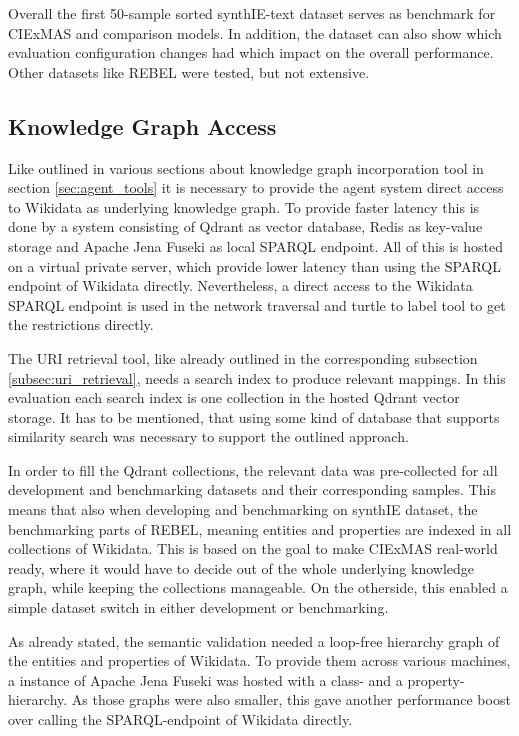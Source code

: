 \documentclass[a4paper,oneside,bibliography=totoc]{scrbook}
\begin{document}
Overall the first 50-sample sorted synthIE-text dataset serves as benchmark for CIExMAS and comparison models. In addition, the dataset can also show which evaluation configuration changes had which impact on the overall performance. Other datasets like REBEL were tested, but not extensive.

\subsection{Knowledge Graph Access}

Like outlined in various sections about knowledge graph incorporation tool in section \ref{sec:agent_tools} it is necessary to provide the agent system direct access to Wikidata as underlying knowledge graph. To provide faster latency this is done by a system consisting of Qdrant as vector database, Redis as key-value storage and Apache Jena Fuseki as local SPARQL endpoint. All of this is hosted on a virtual private server, which provide lower latency than using the SPARQL endpoint of Wikidata directly. Nevertheless, a direct access to the Wikidata SPARQL endpoint is used in the network traversal and turtle to label tool to get the restrictions directly.

The URI retrieval tool, like already outlined in the corresponding subsection \ref{subsec:uri_retrieval}, needs a search index to produce relevant mappings. In this evaluation each search index is one collection in the hosted Qdrant vector storage. It has to be mentioned, that using some kind of database that supports similarity search was necessary to support the outlined approach.

In order to fill the Qdrant collections, the relevant data was pre-collected for all development and benchmarking datasets and their corresponding samples. This means that also when developing and benchmarking on synthIE dataset, the benchmarking parts of REBEL, meaning entities and properties are indexed in all collections of Wikidata. This is based on the goal to make CIExMAS real-world ready, where it would have to decide out of the whole underlying knowledge graph, while keeping the collections manageable. On the otherside, this enabled a simple dataset switch in either development or benchmarking.

As already stated, the semantic validation needed a loop-free hierarchy graph of the entities and properties of Wikidata. To provide them across various machines, a instance of Apache Jena Fuseki was hosted with a class- and a property-hierarchy. As those graphs were also smaller, this gave another performance boost over calling the SPARQL-endpoint of Wikidata directly.
\end{document}
